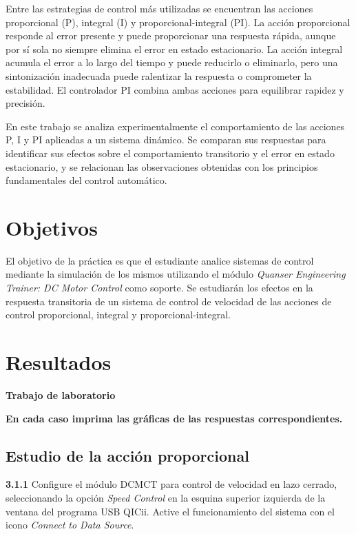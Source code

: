 \documentclass[12pt]{article}
\begin{document}
Entre las estrategias de control m\'as utilizadas se encuentran las acciones proporcional (P), integral (I) y proporcional-integral (PI). La acci\'on proporcional responde al error presente y puede proporcionar una respuesta r\'apida, aunque por s\'i sola no siempre elimina el error en estado estacionario. La acci\'on integral acumula el error a lo largo del tiempo y puede reducirlo o eliminarlo, pero una sintonizaci\'on inadecuada puede ralentizar la respuesta o comprometer la estabilidad. El controlador PI combina ambas acciones para equilibrar rapidez y precisi\'on.

En este trabajo se analiza experimentalmente el comportamiento de las acciones P, I y PI aplicadas a un sistema din\'amico. Se comparan sus respuestas para identificar sus efectos sobre el comportamiento transitorio y el error en estado estacionario, y se relacionan las observaciones obtenidas con los principios fundamentales del control autom\'atico.

\newpage

\section{Objetivos}
El objetivo de la pr\'actica es que el estudiante analice sistemas de control mediante la simulaci\'on de los mismos utilizando el m\'odulo \textit{Quanser Engineering Trainer: DC Motor Control} como soporte. Se estudiar\'an los efectos en la respuesta transitoria de un sistema de control de velocidad de las acciones de control proporcional, integral y proporcional-integral.

\newpage

\section{Resultados}
\textbf{Trabajo de laboratorio}

\textbf{En cada caso imprima las gr\'aficas de las respuestas correspondientes.}

\subsection{Estudio de la acci\'on proporcional}

\noindent\textbf{3.1.1} Configure el m\'odulo DCMCT para control de velocidad en lazo cerrado, seleccionando la opci\'on \textit{Speed Control} en la esquina superior izquierda de la ventana del programa USB QICii. Active el funcionamiento del sistema con el icono \textit{Connect to Data Source}.
\end{document}
